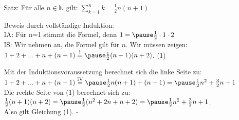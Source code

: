 \begin{frame}[fragile]


Satz: Für alle $n \in \mathbb{N}$ gilt: $\sum\limits_{k=1}^{n}k= \frac{1}{2}n(n+1)$ \pause

Beweis durch vollständige Induktion: \\
IA: \pause Für n=1 stimmt die Formel, denn \pause $1 = \pause \frac{1}{2}\cdot 1 \cdot 2$ \\ \pause
IS: \pause Wir nehmen an, die Formel gilt für $n$. Wir müssen zeigen: \pause \\
$1 + 2 + ... + n + (n+1)  \overset{!}{=} \pause \frac{1}{2}(n+1)(n+2)$.  \quad \quad (1) \\ \pause

Mit der Induktionsvoraussetzung berechnet sich die linke Seite zu: \\
$1 + 2 + ... + n + (n+1)  \overset{\text{IV}}{=}  \pause \frac{1}{2}n(n+1) + (n+1) = \pause \frac{1}{2}n^2 + \frac{3}{2}n +1$ \\ \pause
Die rechte Seite von (1) berechnet sich zu: \\
 $\frac{1}{2}(n+1)(n+2) = \pause \frac{1}{2}(n^2+2n+n+2) = \pause \frac{1}{2}n^2+ \frac{3}{2}n+1$. \\ \pause
Also gilt Gleichung (1).  \hfill $\square$


\end{frame}




